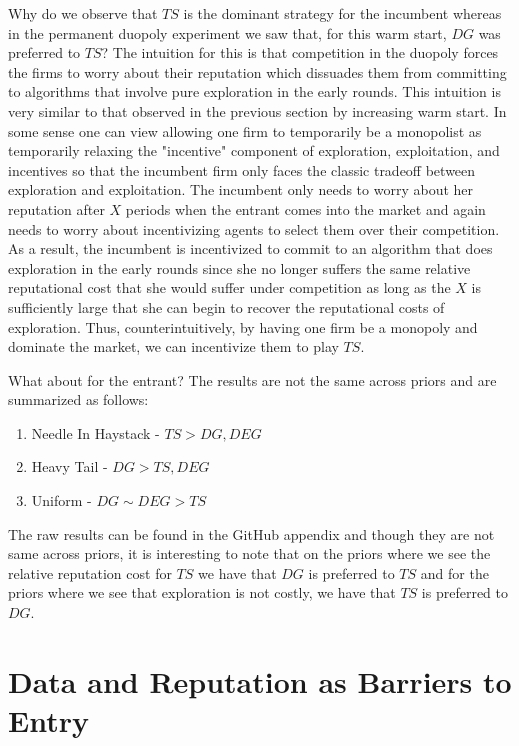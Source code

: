 \documentclass{article}
\theoremstyle{definition}
\begin{document}
Why do we observe that $TS$ is the dominant strategy for the incumbent whereas in the permanent duopoly experiment we saw that, for this warm start, $DG$ was preferred to $TS$? The intuition for this is that competition in the duopoly forces the firms to worry about their reputation which dissuades them from committing to algorithms that involve pure exploration in the early rounds. This intuition is very similar to that observed in the previous section by increasing warm start. In some sense one can view allowing one firm to temporarily be a monopolist as temporarily relaxing the "incentive" component of exploration, exploitation, and incentives so that the incumbent firm only faces the classic tradeoff between exploration and exploitation. The incumbent only needs to worry about her reputation after $X$ periods when the entrant comes into the market and again needs to worry about incentivizing agents to select them over their competition. As a result, the incumbent is incentivized to commit to an algorithm that does exploration in the early rounds since she no longer suffers the same relative reputational cost that she would suffer under competition as long as the $X$ is sufficiently large that she can begin to recover the reputational costs of exploration. Thus, counterintuitively, by having one firm be a monopoly and dominate the market, we can incentivize them to play $TS$.

What about for the entrant? The results are not the same across priors and are summarized as follows:
\begin{enumerate}
\item Needle In Haystack - $TS > DG, DEG$
\item Heavy Tail - $DG > TS, DEG$
\item Uniform - $DG \sim DEG > TS$
\end{enumerate}
The raw results can be found in the GitHub appendix and though they are not same across priors, it is interesting to note that on the priors where we see the relative reputation cost for $TS$ we have that $DG$ is preferred to $TS$ and for the priors where we see that exploration is not costly, we have that $TS$ is preferred to $DG$.

\section{Data and Reputation as Barriers to Entry}\label{section:6}
\end{document}
